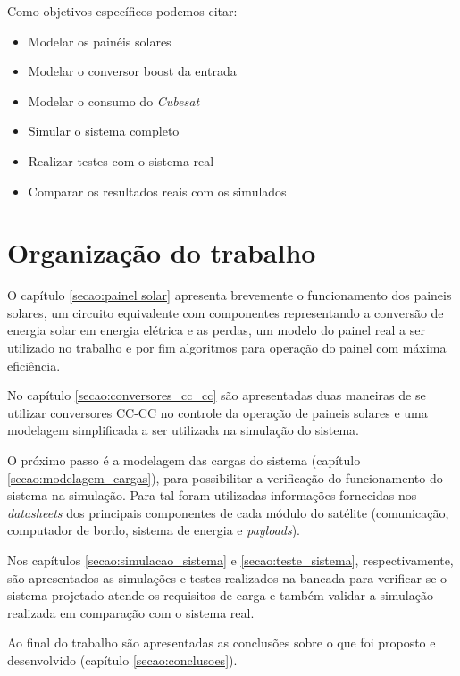 Como objetivos específicos podemos citar:
\begin{itemize}
\item Modelar os painéis solares
\item Modelar o conversor boost da entrada
\item Modelar o consumo do \textit{Cubesat}
\item Simular o sistema completo
\item Realizar testes com o sistema real
\item Comparar os resultados reais com os simulados
\end{itemize}

\section{Organização do trabalho}

O capítulo \ref{secao:painel solar} apresenta brevemente o funcionamento dos paineis solares, um circuito equivalente com componentes representando a conversão de energia solar em energia elétrica e as perdas, um modelo do painel real a ser utilizado no trabalho e por fim algoritmos para operação do painel com máxima eficiência.

No capítulo \ref{secao:conversores_cc_cc} são apresentadas duas maneiras de se utilizar conversores CC-CC no controle da operação de paineis solares e uma modelagem simplificada a ser utilizada na simulação do sistema.

O próximo passo é a modelagem das cargas do sistema (capítulo \ref{secao:modelagem_cargas}), para possibilitar a verificação do funcionamento do sistema na simulação. Para tal foram utilizadas informações fornecidas nos \textit{datasheets} dos principais componentes de cada módulo do satélite (comunicação, computador de bordo, sistema de energia e \textit{payloads}).

Nos capítulos \ref{secao:simulacao_sistema} e \ref{secao:teste_sistema}, respectivamente, são apresentados as simulações e testes realizados na bancada para verificar se o sistema projetado atende os requisitos de carga e também validar a simulação realizada em comparação com o sistema real.

Ao final do trabalho são apresentadas as conclusões sobre o que foi proposto e desenvolvido (capítulo \ref{secao:conclusoes}).


